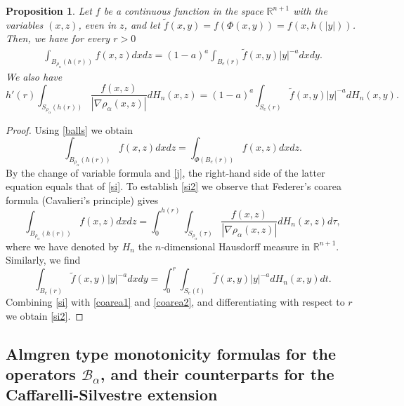 \documentclass[11pt]{amsart}
\theoremstyle{plain}
\newtheorem{prop}[thrm]{Proposition}
\numberwithin{equation}{section}
\begin{document}
\begin{prop}\label{P:integrals}
Let $f$ be a continuous function in the space ${\mathbb R}^{n+1}$ with the variables $(x,z)$, even in $z$, and let $\tilde f(x,y) = f(\Phi(x,y)) = f(x,h(|y|))$. Then, we have for every $r>0$
\begin{align}\label{si}
\int_{B_{\rho_\alpha}(h(r))} f(x,z) dx dz =   (1-a)^a \int_{B_e(r)} \tilde f(x,y) |y|^{-a} dx dy.
\end{align}
We also have
\begin{equation}\label{si2}
h'(r) \int_{S_{\rho_\alpha}(h(r))} \frac{f(x,z)}{|\nabla \rho_\alpha(x,z)|} d H_n(x,z) = (1-a)^a\int_{S_e(r)} \tilde f(x,y) |y|^{-a} dH_n(x,y).
\end{equation}
\end{prop}

\begin{proof}
Using \eqref{balls} we obtain
\[
\int_{B_{\rho_\alpha}(h(r))} f(x,z) dx dz =  \int_{\Phi(B_e(r))} f(x,z) dx dz.
\]
By the change of variable formula and \eqref{j}, the right-hand side of the latter equation equals that of \eqref{si}. To establish \eqref{si2} we observe that Federer's coarea formula (Cavalieri's principle) gives
\begin{equation}\label{coarea1}
\int_{B_{\rho_\alpha}(h(r))} f(x,z) dx dz = \int_0^{h(r)} \int_{S_{\rho_\alpha}(\tau)} \frac{f(x,z)}{|\nabla \rho_\alpha(x,z)|} d H_n(x,z) d\tau,
\end{equation}
where we have denoted by $H_n$ the $n$-dimensional Hausdorff measure in ${\mathbb R}^{n+1}$. Similarly, we find
\begin{equation}\label{coarea2}
 \int_{B_e(r)} \tilde f(x,y) |y|^{-a} dx dy =  \int_0^r \int_{S_e(t)} \tilde f(x,y) |y|^{-a} dH_n(x,y) dt.
 \end{equation}
Combining \eqref{si} with \eqref{coarea1} and \eqref{coarea2}, and differentiating with respect to $r$ we obtain
\eqref{si2}.
\end{proof}

\subsection{Almgren type monotonicity formulas for the operators ${\mathcal{B}_\alpha}$, and their counterparts for the Caffarelli-Silvestre extension}\label{S:bg}
\end{document}
